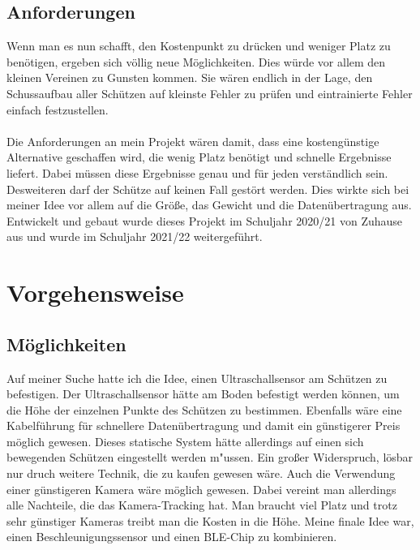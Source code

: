 \subsection{Anforderungen}
Wenn man es nun schafft, den Kostenpunkt zu drücken und weniger Platz zu benötigen,
ergeben sich völlig neue Möglichkeiten. Dies würde vor allem den kleinen Vereinen zu Gunsten 
kommen. Sie wären endlich in der Lage, den Schussaufbau aller Schützen auf kleinste Fehler 
zu prüfen und eintrainierte Fehler einfach festzustellen.\\
\\
Die Anforderungen an mein Projekt wären damit, dass eine kostengünstige Alternative 
geschaffen wird, die wenig Platz benötigt und schnelle Ergebnisse liefert. Dabei müssen diese 
Ergebnisse genau und für jeden verständlich sein.\\
Desweiteren darf der Schütze auf keinen Fall gestört werden.
Dies wirkte sich bei meiner Idee vor allem auf die Größe, das Gewicht und die 
Datenübertragung aus.\\
Entwickelt und gebaut wurde dieses Projekt im Schuljahr 2020/21 von Zuhause aus und wurde 
im Schuljahr 2021/22 weitergeführt.

\section{Vorgehensweise}
\subsection{Möglichkeiten}
Auf meiner Suche hatte ich die Idee, einen Ultraschallsensor am Schützen zu befestigen. Der 
Ultraschallsensor hätte am Boden befestigt werden können, um die Höhe der einzelnen 
Punkte des Schützen zu bestimmen. Ebenfalls wäre eine Kabelführung für schnellere 
Datenübertragung und damit ein günstigerer Preis möglich gewesen. Dieses statische System
hätte allerdings auf einen sich bewegenden Schützen eingestellt werden m"ussen. Ein großer Widerspruch,
lösbar nur druch weitere Technik, die zu kaufen gewesen wäre.
Auch die Verwendung einer günstigeren Kamera wäre möglich gewesen. Dabei vereint man 
allerdings alle Nachteile, die das Kamera-Tracking hat. Man braucht viel Platz und trotz sehr 
günstiger Kameras treibt man die Kosten in die Höhe.
Meine finale Idee war, einen Beschleunigungssensor und einen BLE-Chip zu kombinieren.

%

